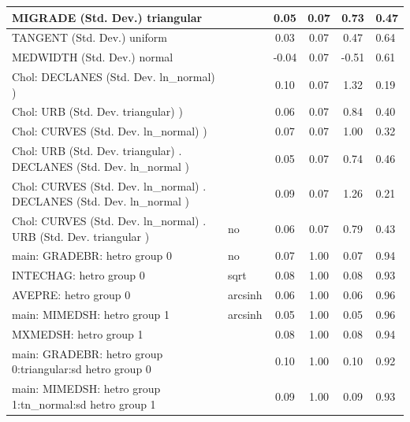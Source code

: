 \begin{table}
\begin{center}
\begin{tabular}{|l|l|c|c|c|l|}
			\hline
			MIGRADE (Std. Dev.) triangular &  & 0.05 & 0.07 & 0.73 & 0.47 \\
			\hline
			TANGENT (Std. Dev.) uniform &  & 0.03 & 0.07 & 0.47 & 0.64 \\
			\hline
			MEDWIDTH (Std. Dev.) normal &  & -0.04 & 0.07 & -0.51 & 0.61 \\
			\hline
			 Chol: DECLANES (Std. Dev. ln_normal) ) &  & 0.10 & 0.07 & 1.32 & 0.19 \\
			\hline
			 Chol: URB (Std. Dev. triangular) ) &  & 0.06 & 0.07 & 0.84 & 0.40 \\
			\hline
			 Chol: CURVES (Std. Dev. ln_normal) ) &  & 0.07 & 0.07 & 1.00 & 0.32 \\
			\hline
			 Chol: URB (Std. Dev. triangular) . DECLANES (Std. Dev.   ln_normal ) &  & 0.05 & 0.07 & 0.74 & 0.46 \\
			\hline
			 Chol: CURVES (Std. Dev. ln_normal) . DECLANES (Std. Dev.   ln_normal ) &  & 0.09 & 0.07 & 1.26 & 0.21 \\
			\hline
			 Chol: CURVES (Std. Dev. ln_normal) . URB (Std. Dev.   triangular ) & no & 0.06 & 0.07 & 0.79 & 0.43 \\
			\hline
			main: GRADEBR: hetro group 0 & no & 0.07 & 1.00 & 0.07 & 0.94 \\
			\hline
			INTECHAG: hetro group 0 & sqrt & 0.08 & 1.00 & 0.08 & 0.93 \\
			\hline
			AVEPRE: hetro group 0 & arcsinh & 0.06 & 1.00 & 0.06 & 0.96 \\
			\hline
			main: MIMEDSH: hetro group 1 & arcsinh & 0.05 & 1.00 & 0.05 & 0.96 \\
			\hline
			MXMEDSH: hetro group 1 &  & 0.08 & 1.00 & 0.08 & 0.94 \\
			\hline
			main: GRADEBR: hetro group 0:triangular:sd  hetro group 0 &  & 0.10 & 1.00 & 0.10 & 0.92 \\
			\hline
			main: MIMEDSH: hetro group 1:tn_normal:sd  hetro group 1 &  & 0.09 & 1.00 & 0.09 & 0.93 \\
			\hline
		\end{tabular}
	\end{center}
\end{table}